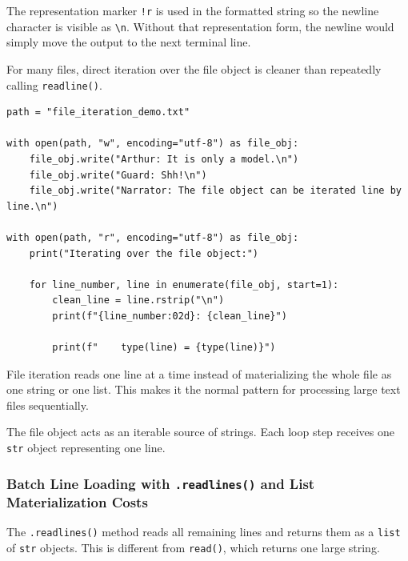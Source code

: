 The representation marker \texttt{!r} is used in the formatted string so the newline character is visible as \texttt{\textbackslash n}. Without that representation form, the newline would simply move the output to the next terminal line.

For many files, direct iteration over the file object is cleaner than repeatedly calling \texttt{readline()}.

\begin{verbatim}
path = "file_iteration_demo.txt"

with open(path, "w", encoding="utf-8") as file_obj:
    file_obj.write("Arthur: It is only a model.\n")
    file_obj.write("Guard: Shh!\n")
    file_obj.write("Narrator: The file object can be iterated line by line.\n")

with open(path, "r", encoding="utf-8") as file_obj:
    print("Iterating over the file object:")

    for line_number, line in enumerate(file_obj, start=1):
        clean_line = line.rstrip("\n")
        print(f"{line_number:02d}: {clean_line}")

        print(f"    type(line) = {type(line)}")
\end{verbatim}

File iteration reads one line at a time instead of materializing the whole file as one string or one list. This makes it the normal pattern for processing large text files sequentially.

The file object acts as an iterable source of strings. Each loop step receives one \texttt{str} object representing one line.

\subsubsection{Batch Line Loading with \texttt{.readlines()} and List Materialization Costs}

The \texttt{.readlines()} method reads all remaining lines and returns them as a \texttt{list} of \texttt{str} objects. This is different from \texttt{read()}, which returns one large string.


